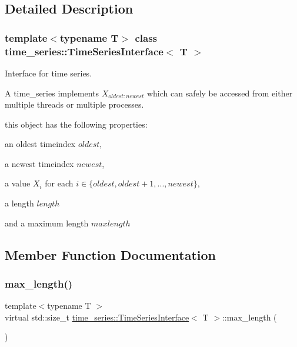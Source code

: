 \subsection{Detailed Description}
\subsubsection*{template$<$typename T$>$\newline
class time\+\_\+series\+::\+Time\+Series\+Interface$<$ T $>$}

Interface for time series. 

A time\+\_\+series implements $ X_{{oldest}:{newest}} $ which can safely be accessed from either multiple threads or multiple processes.

this object has the following properties\+:
\begin{DoxyItemize}
\item an oldest timeindex $ oldest$,
\item a newest timeindex $ newest $,
\item a value $ X_i $ for each $ i \in \{oldest, oldest + 1 , ..., newest\} $,
\item a length $length$
\item and a maximum length $maxlength$ 
\end{DoxyItemize}

\subsection{Member Function Documentation}
\mbox{\label{classtime__series_1_1TimeSeriesInterface_aded8927e82c060aa3367f17dfd59a8ec}} 
\subsubsection{\texorpdfstring{max\+\_\+length()}{max\_length()}}
{\footnotesize\ttfamily template$<$typename T $>$ \\
virtual std\+::size\+\_\+t \hyperlink{classtime__series_1_1TimeSeriesInterface}{time\+\_\+series\+::\+Time\+Series\+Interface}$<$ T $>$\+::max\+\_\+length (\begin{DoxyParamCaption}{ }\end{DoxyParamCaption})\hspace{0.3cm}{\ttfamily [pure virtual]}}



